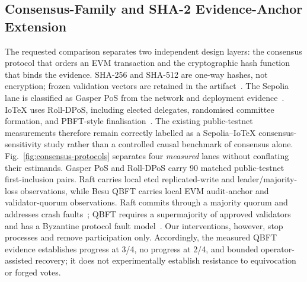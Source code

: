 \documentclass[journal]{IEEEtran}
\begin{document}
\subsection{Consensus-Family and SHA-2 Evidence-Anchor Extension}
\label{sec:consensus-extension}
The requested comparison separates two independent design layers: the
consensus protocol that orders an EVM transaction and the cryptographic hash
function that binds the evidence. SHA-256 and SHA-512 are one-way hashes, not
encryption; frozen validation vectors are retained in the
artifact~\cite{artifactRepo}. The Sepolia lane is classified as Gasper PoS
from the network and deployment
evidence~\cite{ethereumNetworks,artifactRepo}. IoTeX uses Roll-DPoS, including
elected delegates, randomised committee formation, and PBFT-style
finalisation~\cite{iotexRollDpos}. The existing public-testnet measurements
therefore remain correctly labelled as a Sepolia--IoTeX
consensus-sensitivity study rather than a controlled causal benchmark of
consensus alone.
Fig.~\ref{fig:consensus-protocols} separates four \emph{measured} lanes
without conflating their estimands. Gasper PoS and Roll-DPoS carry 90 matched
public-testnet first-inclusion pairs. Raft carries local etcd replicated-write
and leader/majority-loss observations, while Besu QBFT carries local EVM
audit-anchor and validator-quorum observations. Raft commits through a
majority quorum and addresses crash faults~\cite{ongaro2014raft}; QBFT requires
a supermajority of approved validators and has a Byzantine protocol fault
model~\cite{besuQbft}. Our interventions, however, stop processes and remove
participation only. Accordingly, the measured QBFT evidence establishes
progress at 3/4, no progress at 2/4, and bounded operator-assisted recovery;
it does not experimentally establish resistance to equivocation or forged
votes.
\end{document}
